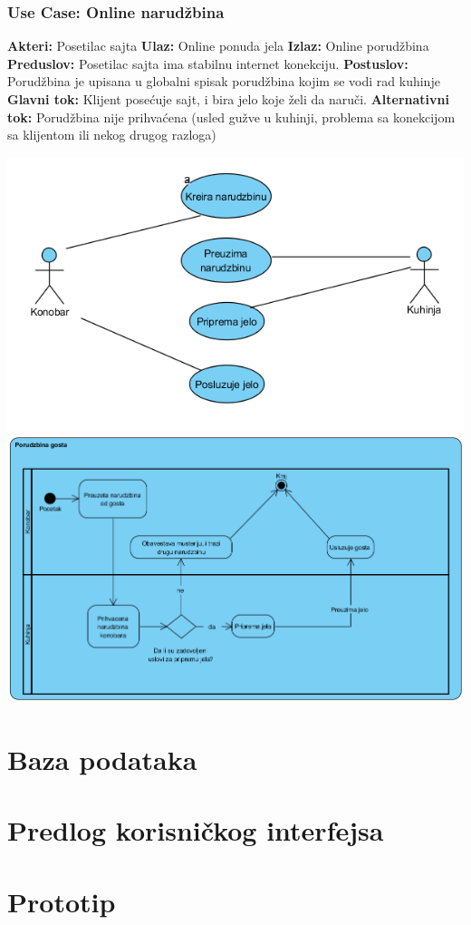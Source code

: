 \documentclass{article}
\begin{document}
\subsubsection{\textbf{Use Case:} Online narudžbina}
\textbf{Akteri:} Posetilac sajta
\textbf{Ulaz:} Online ponuda jela
\textbf{Izlaz:} Online porudžbina
\textbf{Preduslov:} Posetilac sajta ima stabilnu internet konekciju.
\textbf{Postuslov:} Porudžbina je upisana u globalni spisak porudžbina kojim se vodi rad kuhinje
\textbf{Glavni tok:} Klijent posećuje sajt, i bira jelo koje želi da naruči.
\textbf{Alternativni tok:} Porudžbina nije prihvaćena (usled gužve u kuhinji, problema sa konekcijom sa klijentom ili nekog drugog razloga)

\includegraphics[width=\textwidth]{SU_7_konobar_kuhinja.png}
\includegraphics[width=\textwidth]{SU_7_porudzbina.png}


\section{Baza podataka}


\section{Predlog korisničkog interfejsa}


\section{Prototip}

\end{document}

